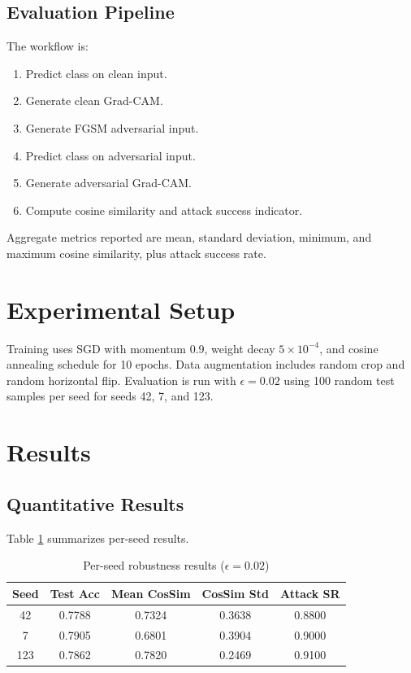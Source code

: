 \documentclass[conference]{IEEEtran}
\begin{document}
\subsection{Evaluation Pipeline}
The workflow is:
\begin{enumerate}
\item Predict class on clean input.
\item Generate clean Grad-CAM.
\item Generate FGSM adversarial input.
\item Predict class on adversarial input.
\item Generate adversarial Grad-CAM.
\item Compute cosine similarity and attack success indicator.
\end{enumerate}

Aggregate metrics reported are mean, standard deviation, minimum, and maximum cosine similarity, plus attack success rate.

\section{Experimental Setup}
Training uses SGD with momentum 0.9, weight decay $5\times10^{-4}$, and cosine annealing schedule for 10 epochs. Data augmentation includes random crop and random horizontal flip. Evaluation is run with $\epsilon=0.02$ using 100 random test samples per seed for seeds 42, 7, and 123.

\section{Results}
\subsection{Quantitative Results}
Table \ref{tab:results} summarizes per-seed results.

\begin{table}[htbp]
\caption{Per-seed robustness results ($\epsilon=0.02$)}
\label{tab:results}
\centering
\begin{tabular}{ccccc}
\toprule
Seed & Test Acc & Mean CosSim & CosSim Std & Attack SR \\
\midrule
42  & 0.7788 & 0.7324 & 0.3638 & 0.8800 \\
7   & 0.7905 & 0.6801 & 0.3904 & 0.9000 \\
123 & 0.7862 & 0.7820 & 0.2469 & 0.9100 \\
\bottomrule
\end{tabular}
\end{table}
\end{document}

